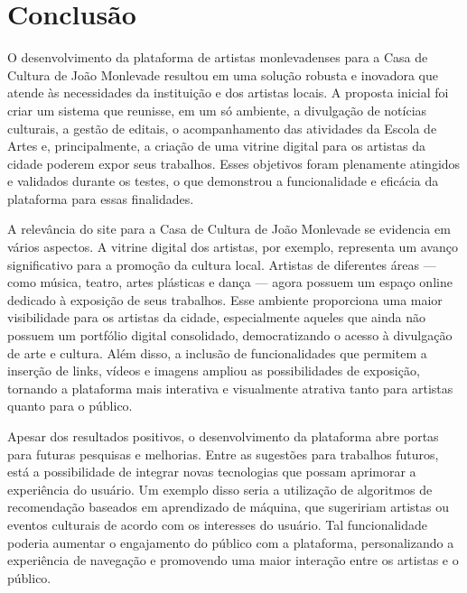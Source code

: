 \chapter[Conclusão]{Conclusão}

O desenvolvimento da plataforma de artistas monlevadenses para a Casa de Cultura de João Monlevade resultou em uma solução robusta e inovadora que atende às necessidades da instituição e dos artistas locais. A proposta inicial foi criar um sistema que reunisse, em um só ambiente, a divulgação de notícias culturais, a gestão de editais, o acompanhamento das atividades da Escola de Artes e, principalmente, a criação de uma vitrine digital para os artistas da cidade poderem expor seus trabalhos. Esses objetivos foram plenamente atingidos e validados durante os testes, o que demonstrou a funcionalidade e eficácia da plataforma para essas finalidades.

A relevância do site para a Casa de Cultura de João Monlevade se evidencia em vários aspectos. A vitrine digital dos artistas, por exemplo, representa um avanço significativo para a promoção da cultura local. Artistas de diferentes áreas — como música, teatro, artes plásticas e dança — agora possuem um espaço online dedicado à exposição de seus trabalhos. Esse ambiente proporciona uma maior visibilidade para os artistas da cidade, especialmente aqueles que ainda não possuem um portfólio digital consolidado, democratizando o acesso à divulgação de arte e cultura. Além disso, a inclusão de funcionalidades que permitem a inserção de links, vídeos e imagens ampliou as possibilidades de exposição, tornando a plataforma mais interativa e visualmente atrativa tanto para artistas quanto para o público.

Apesar dos resultados positivos, o desenvolvimento da plataforma abre portas para futuras pesquisas e melhorias. Entre as sugestões para trabalhos futuros, está a possibilidade de integrar novas tecnologias que possam aprimorar a experiência do usuário. Um exemplo disso seria a utilização de algoritmos de recomendação baseados em aprendizado de máquina, que sugeririam artistas ou eventos culturais de acordo com os interesses do usuário. Tal funcionalidade poderia aumentar o engajamento do público com a plataforma, personalizando a experiência de navegação e promovendo uma maior interação entre os artistas e o público.

